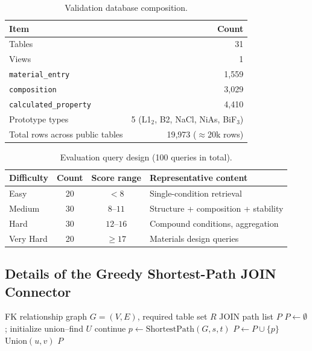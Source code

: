 \begin{table}[t]
\centering
\caption{Validation database composition.}
\label{tab:db_stats}
\footnotesize
\begin{tabular}{@{}lr@{}}
\toprule
Item & Count \\
\midrule
Tables & 31 \\
Views & 1 \\
\texttt{material\_entry} & 1{,}559 \\
\texttt{composition} & 3{,}029 \\
\texttt{calculated\_property} & 4{,}410 \\
Prototype types & 5 (L1$_2$, B2, NaCl, NiAs, BiF$_3$) \\
Total rows across public tables & 19{,}973 ($\approx$20k rows) \\
\bottomrule
\end{tabular}
\end{table}

\begin{table}[t]
  \centering
  \caption{Evaluation query design (100 queries in total).}
  \label{tab:query_design}
  \footnotesize
  \begin{tabular}{@{}lccl@{}}
    \toprule
    Difficulty & Count & Score range & Representative content \\
    \midrule
    Easy & 20 & $< 8$ & Single-condition retrieval \\
    Medium & 30 & $8$--$11$ & Structure + composition + stability \\
    Hard & 30 & $12$--$16$ & Compound conditions, aggregation \\
    Very Hard & 20 & $\geq 17$ & Materials design queries \\
    \bottomrule
  \end{tabular}
\end{table}

\subsection{Details of the Greedy Shortest-Path JOIN Connector}

\begin{algorithm}[htbp]
  \caption{Greedy shortest-path JOIN heuristic connecting required tables.}
  \label{alg:join_connector}
  \begin{algorithmic}[1]
    \Require FK relationship graph $G = (V, E)$, required table set $R$
    \Ensure JOIN path list $P$
    \State $P \gets \emptyset$; initialize union--find $U$
        \State continue
      \EndIf
      \State $p \gets \text{ShortestPath}(G, s, t)$ 
        \State $P \gets P \cup \{p\}$
          \State $\text{Union}(u, v)$
        \EndFor
      \EndIf
    \EndFor
    \State \Return $P$
  \end{algorithmic}
\end{algorithm}

